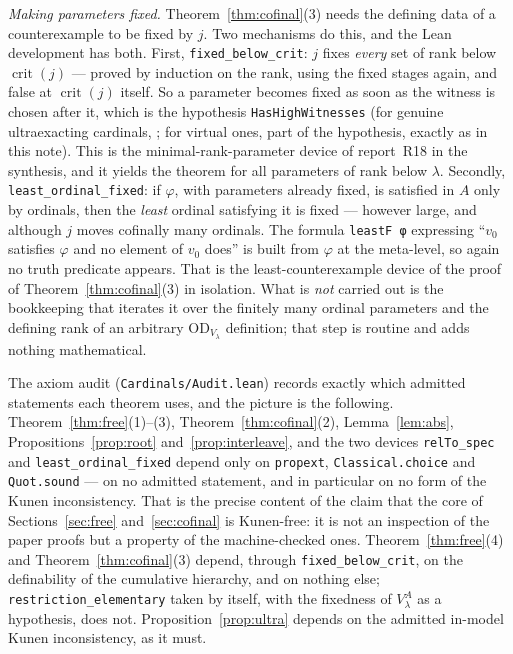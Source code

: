 \documentclass[11pt,letterpaper]{article}
\theoremstyle{definition}
\numberwithin{equation}{section}
\newcommand{\OD}{\mathrm{OD}}
\newcommand{\crit}{\operatorname{crit}}
\begin{document}
\emph{Making parameters fixed.} Theorem~\ref{thm:cofinal}(3) needs the defining data of a counterexample to be fixed by $j$. Two mechanisms do this, and the Lean development has both. First, \nolinkurl{fixed_below_crit}: $j$ fixes \emph{every} set of rank below $\crit(j)$ --- proved by induction on the rank, using the fixed stages again, and false at $\crit(j)$ itself. So a parameter becomes fixed as soon as the witness is chosen after it, which is the hypothesis \nolinkurl{HasHighWitnesses} (for genuine ultraexacting cardinals, \cite[Lemma~3.2]{abl}; for virtual ones, part of the hypothesis, exactly as in this note). This is the minimal-rank-parameter device of report~R18 in the synthesis, and it yields the theorem for all parameters of rank below $\lambda$. Secondly, \nolinkurl{least_ordinal_fixed}: if $\varphi$, with parameters already fixed, is satisfied in $A$ only by ordinals, then the \emph{least} ordinal satisfying it is fixed --- however large, and although $j$ moves cofinally many ordinals. The formula \nolinkurl{leastF φ} expressing ``$v_0$ satisfies $\varphi$ and no element of $v_0$ does'' is built from $\varphi$ at the meta-level, so again no truth predicate appears. That is the least-counterexample device of the proof of Theorem~\ref{thm:cofinal}(3) in isolation. What is \emph{not} carried out is the bookkeeping that iterates it over the finitely many ordinal parameters and the defining rank of an arbitrary $\OD_{V_\lambda}$ definition; that step is routine and adds nothing mathematical.

The axiom audit (\nolinkurl{Cardinals/Audit.lean}) records exactly which admitted statements each theorem uses, and the picture is the following. Theorem~\ref{thm:free}(1)--(3), Theorem~\ref{thm:cofinal}(2), Lemma~\ref{lem:abs}, Propositions~\ref{prop:root} and~\ref{prop:interleave}, and the two devices \nolinkurl{relTo_spec} and \nolinkurl{least_ordinal_fixed} depend only on \nolinkurl{propext}, \nolinkurl{Classical.choice} and \nolinkurl{Quot.sound} --- on no admitted statement, and in particular on no form of the Kunen inconsistency. That is the precise content of the claim that the core of Sections~\ref{sec:free} and~\ref{sec:cofinal} is Kunen-free: it is not an inspection of the paper proofs but a property of the machine-checked ones. Theorem~\ref{thm:free}(4) and Theorem~\ref{thm:cofinal}(3) depend, through \nolinkurl{fixed_below_crit}, on the definability of the cumulative hierarchy, and on nothing else; \nolinkurl{restriction_elementary} taken by itself, with the fixedness of $V^A_\lambda$ as a hypothesis, does not. Proposition~\ref{prop:ultra} depends on the admitted in-model Kunen inconsistency, as it must.
\end{document}
